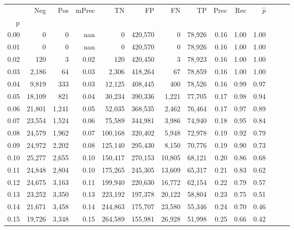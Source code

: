 \begin{tabular}{rrrrrrrrrrrrrr}
\toprule
{} &     Neg &    Pos & mPrec &       TN &       FP &      FN &      TP &  Prec &   Rec & $\hat{p}$ \\
p    &         &        &       &          &          &         &         &       &       &           \\
\midrule
0.00 &       0 &      0 &   nan &        0 &  420,570 &       0 &  78,926 &  0.16 &  1.00 &      1.00 \\
0.01 &       0 &      0 &   nan &        0 &  420,570 &       0 &  78,926 &  0.16 &  1.00 &      1.00 \\
0.02 &     120 &      3 &  0.02 &      120 &  420,450 &       3 &  78,923 &  0.16 &  1.00 &      1.00 \\
0.03 &   2,186 &     64 &  0.03 &    2,306 &  418,264 &      67 &  78,859 &  0.16 &  1.00 &      1.00 \\
0.04 &   9,819 &    333 &  0.03 &   12,125 &  408,445 &     400 &  78,526 &  0.16 &  0.99 &      0.97 \\
0.05 &  18,109 &    821 &  0.04 &   30,234 &  390,336 &   1,221 &  77,705 &  0.17 &  0.98 &      0.94 \\
0.06 &  21,801 &  1,241 &  0.05 &   52,035 &  368,535 &   2,462 &  76,464 &  0.17 &  0.97 &      0.89 \\
0.07 &  23,554 &  1,524 &  0.06 &   75,589 &  344,981 &   3,986 &  74,940 &  0.18 &  0.95 &      0.84 \\
0.08 &  24,579 &  1,962 &  0.07 &  100,168 &  320,402 &   5,948 &  72,978 &  0.19 &  0.92 &      0.79 \\
0.09 &  24,972 &  2,202 &  0.08 &  125,140 &  295,430 &   8,150 &  70,776 &  0.19 &  0.90 &      0.73 \\
0.10 &  25,277 &  2,655 &  0.10 &  150,417 &  270,153 &  10,805 &  68,121 &  0.20 &  0.86 &      0.68 \\
0.11 &  24,848 &  2,804 &  0.10 &  175,265 &  245,305 &  13,609 &  65,317 &  0.21 &  0.83 &      0.62 \\
0.12 &  24,675 &  3,163 &  0.11 &  199,940 &  220,630 &  16,772 &  62,154 &  0.22 &  0.79 &      0.57 \\
0.13 &  23,252 &  3,350 &  0.13 &  223,192 &  197,378 &  20,122 &  58,804 &  0.23 &  0.75 &      0.51 \\
0.14 &  21,671 &  3,458 &  0.14 &  244,863 &  175,707 &  23,580 &  55,346 &  0.24 &  0.70 &      0.46 \\
0.15 &  19,726 &  3,348 &  0.15 &  264,589 &  155,981 &  26,928 &  51,998 &  0.25 &  0.66 &      0.42 \\

\end{tabular}
